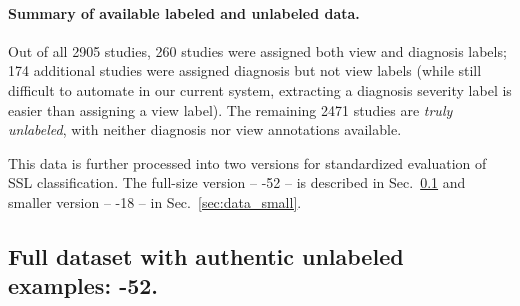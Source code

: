 \paragraph{Summary of available labeled and unlabeled data.}
Out of all 2905 studies,
260 studies were assigned both view and diagnosis labels; 174 additional studies were assigned diagnosis but not view labels (while still difficult to automate in our current system, extracting a diagnosis severity label is easier than assigning a view label). The remaining 2471 studies are \emph{truly unlabeled}, with neither diagnosis nor view annotations available.

This data is further processed into two versions for standardized evaluation of SSL classification. The full-size version -- -52 -- is described in Sec.~\ref{sec:data_full} and smaller version -- -18 -- in Sec.~\ref{sec:data_small}.


%


\subsection{Full dataset with authentic unlabeled examples: -52.}
\label{sec:data_full}

